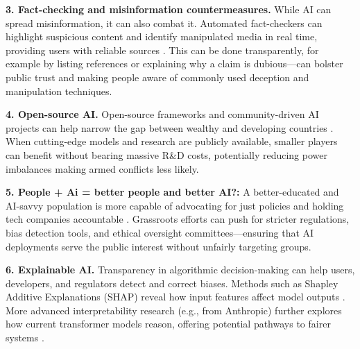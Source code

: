\documentclass[stu,12pt,floatsintext]{apa7}
\begin{document}
\noindent \textbf{3. Fact-checking and misinformation countermeasures.}  
While AI can spread misinformation, it can also combat it. Automated fact-checkers can highlight suspicious content and identify manipulated media in real time, providing users with reliable sources \parencite{TwitterCommunityNotes_2022, Wired_Deepfakes_2020}. This can be done transparently, for example by listing references or explaining why a claim is dubious—can bolster public trust and making people aware of commonly used deception and manipulation techniques.

\noindent \textbf{4. Open-source AI.}  
Open-source frameworks and community-driven AI projects can help narrow the gap between wealthy and developing countries \parencite{Abonamah_Tariq_Shilbayeh_2021}. When cutting-edge models and research are publicly available, smaller players can benefit without bearing massive R\&D costs, potentially reducing power imbalances making armed conflicts less likely.

\noindent \textbf{5. People + Ai = better people and better AI?:}  
A better-educated and AI-savvy population is more capable of advocating for just policies and holding tech companies accountable \parencite{Floridi_AI4People_2018}. Grassroots efforts can push for stricter regulations, bias detection tools, and ethical oversight committees—ensuring that AI deployments serve the public interest without unfairly targeting groups.

\noindent \textbf{6. Explainable AI.}  
Transparency in algorithmic decision-making can help users, developers, and regulators detect and correct biases. Methods such as Shapley Additive Explanations (SHAP) reveal how input features affect model outputs \parencite{Lundberg_Lee_2017}. More advanced interpretability research (e.g., from Anthropic) further explores how current transformer models reason, offering potential pathways to fairer systems \parencite{Anthropic_Blog_2023}.



\printbibliography
\end{document}
